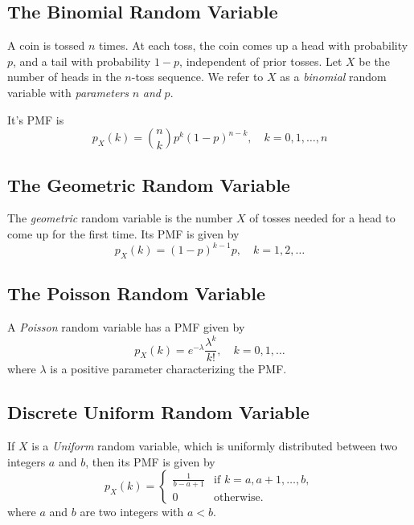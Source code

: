 \documentclass{tufte-handout}
\theoremstyle{definition} \newtheorem{definition}{Definition}
\theoremstyle{definition} \newtheorem{remark}{Remark}
\theoremstyle{definition} \newtheorem{example}{Example}
\newcommand{\pmf}[2]{p_#1\left(#2\right)}
\begin{document}
\subsection{The Binomial Random Variable}
A coin is tossed $n$ times. At each toss, the coin comes up a head with
probability $p$, and a tail with probability $1 - p$, independent of prior
tosses. Let $X$ be the number of heads in the $n$-toss sequence. We refer
to $X$ as a \emph{binomial} random variable with \emph{parameters} $n$
\emph{and} $p$.

It's PMF is
\begin{equation*}
  \pmf{X}{k} = \binom{n}{k} p^k {(1 - p)}^{n - k}, \quad k = 0,1, \ldots, n
\end{equation*}

\subsection{The Geometric Random Variable}
The \emph{geometric} random variable is the number $X$ of tosses needed
for a head to come up for the first time. Its PMF is given by
\begin{equation*}
  \pmf{X}{k} = {(1 - p)}^{k - 1} p, \quad k = 1, 2, \ldots
\end{equation*}

\subsection{The Poisson Random Variable}
A \emph{Poisson} random variable has a PMF given by
\begin{equation*}
  \pmf{X}{k} = e^{-\lambda} \frac{\lambda^k}{k!},\quad k = 0,1, \ldots
\end{equation*}
where $\lambda$ is a positive parameter characterizing the PMF.

\subsection{Discrete Uniform Random Variable}
If $X$ is a \emph{Uniform} random variable, which is uniformly
distributed between two integers $a$ and $b$, then its PMF is given by
\begin{equation*}
  \pmf{X}{k} =
  \begin{cases}
    \frac{1}{b - a + 1} & \text{if } k = a, a + 1, \ldots, b,\\
    0 & \text{otherwise.}
  \end{cases}
\end{equation*}
where $a$ and $b$ are two integers with $a < b$.
\end{document}
